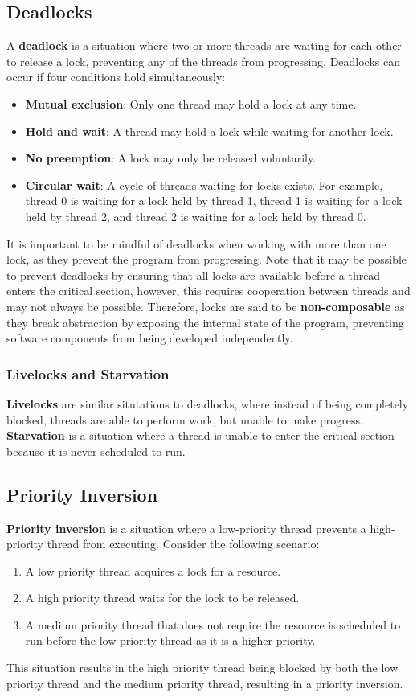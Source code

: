\documentclass{article}
\begin{document}
\subsection{Deadlocks}
A \textbf{deadlock} is a situation where two or more threads are
waiting for each other to release a lock, preventing any of the threads
from progressing. Deadlocks can occur if four conditions hold
simultaneously:
\begin{itemize}
    \item \textbf{Mutual exclusion}: Only one thread may hold a lock at
          any time.
    \item \textbf{Hold and wait}: A thread may hold a lock while waiting
          for another lock.
    \item \textbf{No preemption}: A lock may only be released voluntarily.
    \item \textbf{Circular wait}: A cycle of threads waiting for locks
          exists. For example, thread 0 is waiting for a lock held by
          thread 1, thread 1 is waiting for a lock held by thread 2, and
          thread 2 is waiting for a lock held by thread 0.
\end{itemize}
It is important to be mindful of deadlocks when working with more than
one lock, as they prevent the program from progressing. Note that it may
be possible to prevent deadlocks by ensuring that all locks are available
before a thread enters the critical section, however, this requires
cooperation between threads and may not always be possible. Therefore,
locks are said to be \textbf{non-composable} as they break abstraction
by exposing the internal state of the program, preventing software
components from being developed independently.
\subsubsection{Livelocks and Starvation}
\textbf{Livelocks} are similar situtations to deadlocks, where instead
of being completely blocked, threads are able to perform work, but
unable to make progress. \textbf{Starvation} is a situation where a
thread is unable to enter the critical section because it is never
scheduled to run.
\subsection{Priority Inversion}
\textbf{Priority inversion} is a situation where a low-priority thread
prevents a high-priority thread from executing. Consider the following
scenario:
\begin{enumerate}
    \item A low priority thread acquires a lock for a resource.
    \item A high priority thread waits for the lock to be released.
    \item A medium priority thread that does not require the resource
          is scheduled to run before the low priority thread as it is a
          higher priority.
\end{enumerate}
This situation results in the high priority thread being blocked by both
the low priority thread and the medium priority thread, resulting in a
priority inversion.
\end{document}
